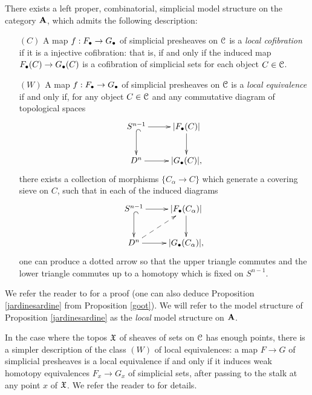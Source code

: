 \begin{proposition}\label{jardinesardine}
There exists a left proper, combinatorial, simplicial model structure on the category ${\mathbf A}$, which admits the following description:

\begin{itemize}
\item[$(C)$] A map $f: F_{\bullet} \rightarrow G_{\bullet}$ of simplicial presheaves on $\operatorname{\mathcal{C}}$
is a {\it local cofibration} if it is a injective cofibration: that is, if and only if the induced map
$F_{\bullet}(C) \rightarrow G_{\bullet}(C)$ is a cofibration of simplicial sets for each object $C \in \operatorname{\mathcal{C}}$.

\item[$(W)$] A map $f: F_{\bullet} \rightarrow G_{\bullet}$ of simplicial presheaves on $\operatorname{\mathcal{C}}$
is a {\it local equivalence} if and only if, for any object $C \in \operatorname{\mathcal{C}}$ and any commutative diagram of topological spaces
$$ \xymatrix{ S^{n-1} \ar[r] \ar@{^{(}->}[d] & |F_{\bigdot}(C)| \ar[d] \\
D^n \ar[r] & |G_{\bigdot}(C)|, } $$
there exists a collection of morphisms $\{ C_{\alpha} \rightarrow C\}$ which generate a covering
sieve on $C$, such that in each of the induced diagrams
$$ \xymatrix{ S^{n-1} \ar[r] \ar@{^{(}->}[d] & |F_{\bigdot}(C_{\alpha})| \ar[d] \\
D^n \ar[r] \ar@{-->}[ur] & |G_{\bigdot}(C_{\alpha})|, } $$
one can produce a dotted arrow so that the upper triangle commutes and the lower triangle
commutes up to a homotopy which is fixed on $S^{n-1}$.
\end{itemize}
\end{proposition}

We refer the reader to \cite{jardine} for a proof (one can also deduce Proposition \ref{jardinesardine} from Proposition \ref{goot}). We will refer to the model structure of Proposition \ref{jardinesardine} as the {\it local} model structure on ${\mathbf A}$.

\begin{remark}\label{pointeddesc}
In the case where the topos $\mathfrak X$ of sheaves of sets on $\operatorname{\mathcal{C}}$ has enough points, there is a simpler description of the class $(W)$ of local equivalences: a map $F \rightarrow G$ of simplicial presheaves is a local equivalence if and only if it induces weak homotopy equivalences 
$F_{x} \rightarrow G_{x}$ of simplicial sets, after passing to the stalk at any point $x$ of $\mathfrak X$.
We refer the reader to \cite{jardine} for details.
\end{remark}

